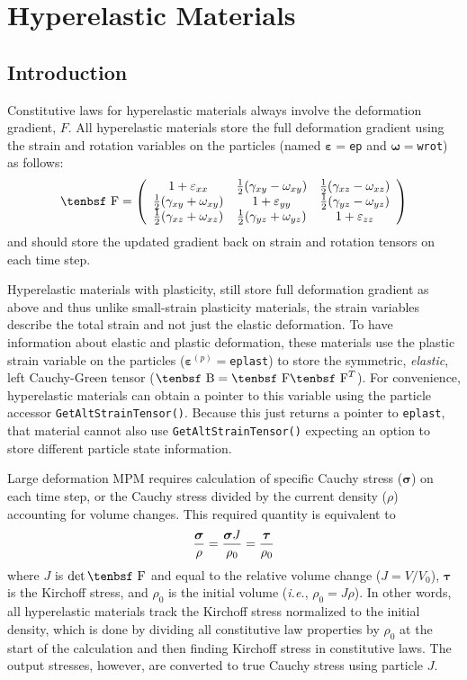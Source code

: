 \documentclass[11pt]{book}
\renewcommand{\vec}[1]{\boldsymbol{#1}}
\def\B{\hbox{\tenbsf B}}
\def\e#1{\varepsilon_{#1}}
\def\ee{\varepsilon}
\def\F{\hbox{\tenbsf F}}
\def\g#1{\gamma_{#1}}
\def\w#1{\omega_{#1}}
\begin{document}
\chapter{Hyperelastic Materials}

\section{Introduction}

Constitutive laws for hyperelastic materials always involve the deformation gradient, $F$. All hyperelastic materials store the full deformation gradient using the strain and rotation variables on the particles (named $\vec\ee=${\tt ep} and $\vec\omega=${\tt wrot}) as follows:
\begin{equation}
   \F = \left(\begin{array}{ccc}
          1 + \e{xx} & {1\over2}(\g{xy}-\w{xy}) & {1\over2}(\g{xz}-\w{xz})   \\
         {1\over2}(\g{xy}+\w{xy})  & 1 + \e{yy} & {1\over2}(\g{yz}-\w{yz})   \\
        {1\over2}(\g{xz}+\w{xz}) & {1\over2}(\g{yz}+\w{yz}) & 1 + \e{zz}
        \end{array}\right)
\end{equation}
and should store the updated gradient back on strain and rotation tensors on each time step.

Hyperelastic materials with plasticity, still store full deformation gradient as above and thus unlike small-strain plasticity materials, the strain variables describe the total strain and not just the elastic deformation. To have information about elastic and plastic deformation, these materials use the plastic strain variable on the particles ($\vec\ee^{(p)}=${\tt eplast}) to store the symmetric, {\em elastic}, left Cauchy-Green tensor ($\B = \F\F^T$). For convenience, hyperelastic materials can obtain a pointer to this variable using the particle accessor {\tt GetAltStrainTensor()}. Because this just returns a pointer to {\tt eplast}, that material cannot also use {\tt GetAltStrainTensor()} expecting an option to store different particle state information.

Large deformation MPM requires calculation of specific Cauchy stress ($\vec\sigma$) on each time step, or the Cauchy stress divided by the current density ($\rho$) accounting for volume changes. This required quantity is equivalent to
\begin{equation}
              {\vec\sigma\over\rho} = {\vec\sigma J\over\rho_0} =  {\vec\tau\over\rho_0}
\end{equation}
where $J$ is $\det \F$ and equal to the relative volume change ($J = V/V_0$), $\vec\tau$ is the Kirchoff stress, and $\rho_0$ is the initial volume ({\em i.e.}, $\rho_0 = J\rho$). In other words, all hyperelastic materials track the Kirchoff stress normalized to the initial density, which is done by dividing all constitutive law properties by $\rho_0$ at the start of the calculation and then finding Kirchoff stress in constitutive laws. The output stresses, however, are converted to true Cauchy stress using particle $J$.
\end{document}
